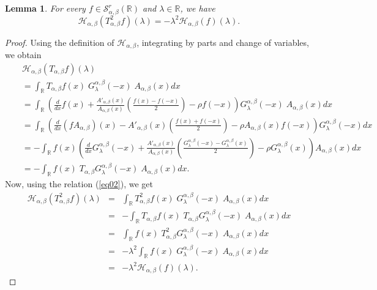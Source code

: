 \documentclass[a4paper,11pt, reqno]{amsart}
\theoremstyle{plain}
\newtheorem{lemma}[theorem]{Lemma}
\theoremstyle{definition}
\theoremstyle{remark}
\def \R{{\mathbb R}}
\def\R{\mathbb R}
\def \S{{\mathcal S}}
\def \H{{\mathcal H}}
\begin{document}
\begin{lemma}
For every $f \in \S^r_{\alpha, \beta} (\mathbb{R})$ and $\lambda \in \R$, we have 
\begin{equation}\label{eq06}
\H_{\alpha, \beta} \left( T^2_{\alpha, \beta} f \right) (\lambda )= - \lambda^2 \H_{\alpha, \beta} (f) (\lambda).
\end{equation}
\end{lemma}
\begin{proof}
Using the definition of $\H_{\alpha, \beta}$, integrating by parts and change of variables, we obtain
\begin{eqnarray*}
&& \H_{\alpha, \beta} \left( T_{\alpha, \beta} f \right) (\lambda ) \\
&& = \int_{\R} T_{\alpha, \beta}f(x)\; G^{\alpha, \beta}_\lambda(-x)\; A_{\alpha, \beta} (x) dx \\
&& = \int_{\R} \left( \frac{d}{dx} f(x)+ \frac{A'_{\alpha, \beta} (x)}{A_{\alpha, \beta} (x)} \left( \frac{f(x)-f(-x)}{2} \right) - \rho f(-x) \right) G^{\alpha, \beta}_\lambda(-x)\; A_{\alpha, \beta} (x) dx \\
&& = \int_{\R} \left( \frac{d}{dx} \left( f A_{\alpha, \beta} \right)(x) - A'_{\alpha, \beta} (x)\left(\frac{f(x)+f(-x)}{2} \right) - \rho A_{\alpha, \beta} (x) f(-x) \right) G^{\alpha, \beta}_\lambda(-x) dx \\ 
&& = - \int_{\R} f(x) \left(  \frac{d}{dx} G^{\alpha, \beta}_\lambda(-x)  + \frac{A'_{\alpha, \beta} (x)}{A_{\alpha, \beta} (x)} \left( \frac{G^{\alpha, \beta}_\lambda(-x) - G^{\alpha, \beta}_\lambda(x)}{2} \right) - \rho G^{\alpha, \beta}_\lambda(x) \right) A_{\alpha, \beta} (x) dx \\
&& =  - \int_{\R} f(x) \; T_{\alpha, \beta}G^{\alpha, \beta}_\lambda(-x)  \; A_{\alpha, \beta} (x) dx. 
\end{eqnarray*}
Now, using the relation (\ref{eq02}), we get
\begin{eqnarray*}
\H_{\alpha, \beta} \left( T^2_{\alpha, \beta} f \right) (\lambda ) 
& = & \int_{\R} T^2_{\alpha, \beta}f(x)\; G^{\alpha, \beta}_\lambda(-x)\; A_{\alpha, \beta} (x) dx \\
& = &  - \int_{\R} T_{\alpha, \beta}f(x) \; T_{\alpha, \beta}G^{\alpha, \beta}_\lambda(-x)  \; A_{\alpha, \beta} (x) dx \\
& = & \int_{\R} f(x) \; T^2_{\alpha, \beta}G^{\alpha, \beta}_\lambda(-x)  \; A_{\alpha, \beta} (x) dx \\
& = & - \lambda^2 \int_{\R} f(x) \; G^{\alpha, \beta}_\lambda(-x)  \; A_{\alpha, \beta} (x) dx \\
& = & - \lambda^2 \H_{\alpha, \beta} (f) (\lambda).
\end{eqnarray*}
\end{proof}
\end{document}
